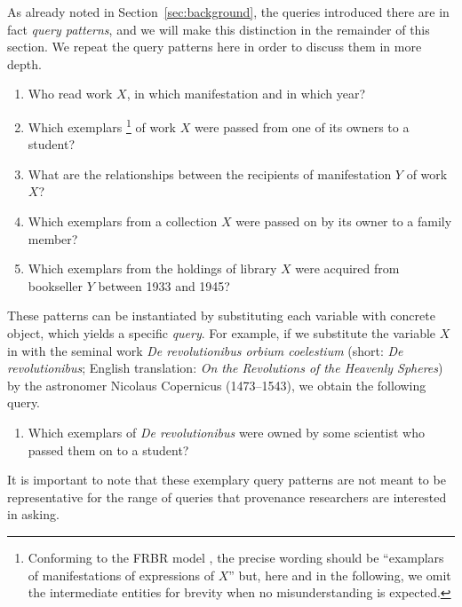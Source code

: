 As already noted in Section~\ref{sec:background}, the queries introduced there
are in fact \emph{query patterns}, and we will make this distinction in the remainder
of this section. We repeat the query patterns here in order to discuss them in more depth.
%
\begin{enumerate}
  \item[\exaquery{1}]
    Who read %
    work $X$, in which manifestation and in which year?
  \item[\exaquery{2}]
    Which exemplars%
    \footnote{%
      Conforming to the FRBR model \autocite{FRBR1998},
      the precise wording should be \enquote{examplars of manifestations of expressions of $X$}
      but, here and in the following,
      we omit the intermediate entities for brevity when no misunderstanding is expected.%
    }
    of work $X$
    were passed from one of its owners to a student?
  \item[\exaquery{3}]
    What are the relationships between the recipients of manifestation $Y$ of work $X$?
  \item[\exaquery{4}]
    Which exemplars from a collection $X$ were passed on by its owner to a family member?
  \item[\exaquery{5}]
    Which exemplars from the holdings of library $X$ were acquired from bookseller $Y$
    between 1933 and 1945?
\end{enumerate}
%
These patterns can be instantiated by substituting each variable with concrete object,
which yields a specific \emph{query}. For example, if we substitute the variable $X$
in  with the seminal work \emph{De revolutionibus orbium coelestium}
(short: \emph{De revolutionibus}; English translation: \emph{On the Revolutions of the Heavenly Spheres}) \autocite{Kopernikus1543}
by the astronomer Nicolaus Copernicus (1473–1543),
we obtain the following query.
%
\begin{enumerate}
  \item[\exaquery{2$'$}]
    Which exemplars of \emph{De revolutionibus} were owned by some scientist who passed them on to a student?
\end{enumerate}
%
It is important to note that these exemplary query patterns are not meant to be representative
for the range of queries that provenance researchers are interested in asking.
